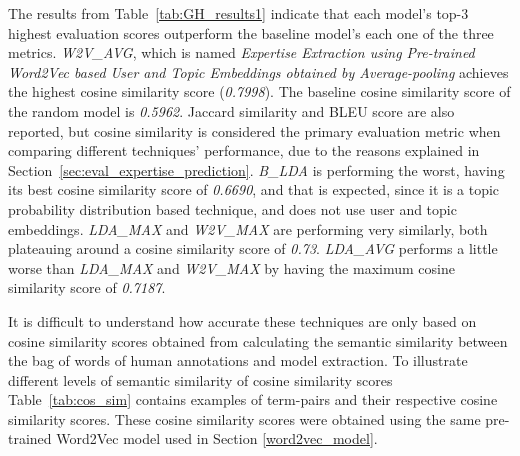             The results from Table~\ref{tab:GH_results1} indicate that each model's top-$3$ highest evaluation scores outperform the baseline model's each one of the three metrics. \emph{W2V\_AVG}, which is named \emph{Expertise Extraction using Pre-trained Word2Vec based User and Topic Embeddings obtained by Average-pooling} achieves the highest cosine similarity score (\emph{0.7998}). The baseline cosine similarity score of the random model is \emph{0.5962}. Jaccard similarity and BLEU score are also reported, but cosine similarity is considered the primary evaluation metric when comparing different techniques' performance, due to the reasons explained in Section~\ref{sec:eval_expertise_prediction}. \emph{B\_LDA} is performing the worst, having its best cosine similarity score of \emph{0.6690}, and that is expected, since it is a topic probability distribution based technique, and does not use user and topic embeddings. \emph{LDA\_MAX} and \emph{W2V\_MAX} are performing very similarly, both plateauing around a cosine similarity score of \emph{0.73}. \emph{LDA\_AVG} performs a little worse than  \emph{LDA\_MAX} and \emph{W2V\_MAX} by having the maximum cosine similarity score of \emph{0.7187}. 
            
            It is difficult to understand how accurate these techniques are only based on cosine similarity scores obtained from calculating the semantic similarity between the bag of words of human annotations and model extraction. To illustrate different levels of semantic similarity of cosine similarity scores Table~\ref{tab:cos_sim} contains examples of term-pairs and their respective cosine similarity scores. These cosine similarity scores were obtained using the same pre-trained Word2Vec model\cite{efstathiou2018word} used in Section \ref{word2vec_model}. 
            
